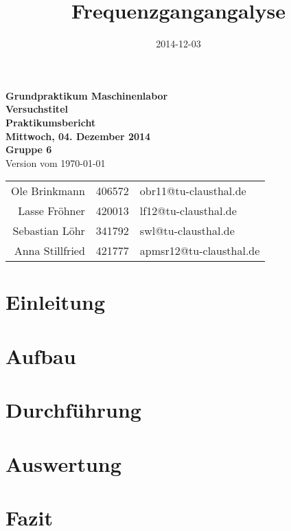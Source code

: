 \documentclass[a4paper,12pt]{scrartcl}
\title{Frequenzgangangalyse}
\date{2014-12-03}
\newcommand{\Revision}{}
\begin{document}
\thispagestyle{empty}
\begin{center}
\vspace*{20mm}

\Large
\textbf{Grundpraktikum Maschinenlabor} \\
\vspace{10mm}
\Huge
\textbf{\textsf{Versuchstitel}} \\
\vspace{10mm}
\large
\textbf{\textsf{Praktikumsbericht}} \\
\textbf{\textsf{Mittwoch, 04. Dezember 2014}} \\
\textbf{\textsf{Gruppe 6}} \\
\ifnum{}
	\textsf{\textcolor{footer-gray}{Version \textit{\Revision} vom \today}} \\
\fi

\vspace{40mm}
\begin{tabular}{rcl}
Ole Brinkmann & 406572 & obr11@tu-clausthal.de \\[4mm]
Lasse Fröhner & 420013 & lf12@tu-clausthal.de \\[4mm]
Sebastian Löhr & 341792 & swl@tu-clausthal.de \\[4mm]
Anna Stillfried & 421777 & apmsr12@tu-clausthal.de \\[4mm]
\end{tabular}

\end{center}

\pagebreak
\restoregeometry

\tableofcontents
\newpage


\section{Einleitung}

\section{Aufbau}

\section{Durchführung}

\section{Auswertung}

\section{Fazit}

\end{document}
